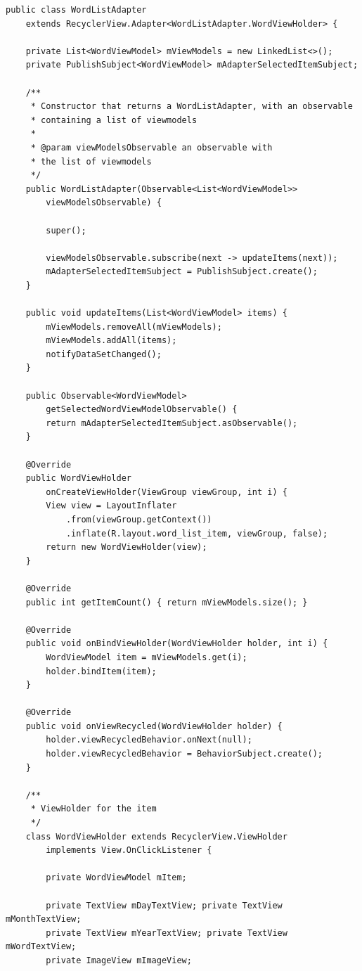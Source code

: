 \begin{verbatim}
public class WordListAdapter
    extends RecyclerView.Adapter<WordListAdapter.WordViewHolder> {

    private List<WordViewModel> mViewModels = new LinkedList<>();
    private PublishSubject<WordViewModel> mAdapterSelectedItemSubject;

    /**
     * Constructor that returns a WordListAdapter, with an observable
     * containing a list of viewmodels
     *
     * @param viewModelsObservable an observable with 
     * the list of viewmodels
     */
    public WordListAdapter(Observable<List<WordViewModel>> 
    	viewModelsObservable) {
    	
        super();

        viewModelsObservable.subscribe(next -> updateItems(next));
        mAdapterSelectedItemSubject = PublishSubject.create();
    }

    public void updateItems(List<WordViewModel> items) {
        mViewModels.removeAll(mViewModels);
        mViewModels.addAll(items);
        notifyDataSetChanged();
    }

    public Observable<WordViewModel> 
    	getSelectedWordViewModelObservable() {
        return mAdapterSelectedItemSubject.asObservable();
    }

    @Override
    public WordViewHolder 
    	onCreateViewHolder(ViewGroup viewGroup, int i) {
        View view = LayoutInflater
            .from(viewGroup.getContext())
            .inflate(R.layout.word_list_item, viewGroup, false);
        return new WordViewHolder(view);
    }

    @Override
    public int getItemCount() { return mViewModels.size(); }

    @Override
    public void onBindViewHolder(WordViewHolder holder, int i) {
        WordViewModel item = mViewModels.get(i);
        holder.bindItem(item);
    }

    @Override
    public void onViewRecycled(WordViewHolder holder) {
        holder.viewRecycledBehavior.onNext(null);
        holder.viewRecycledBehavior = BehaviorSubject.create();
    }

    /**
     * ViewHolder for the item
     */
    class WordViewHolder extends RecyclerView.ViewHolder
        implements View.OnClickListener {

        private WordViewModel mItem;

        private TextView mDayTextView; private TextView mMonthTextView;
        private TextView mYearTextView; private TextView mWordTextView;
        private ImageView mImageView;


\end{verbatim}
